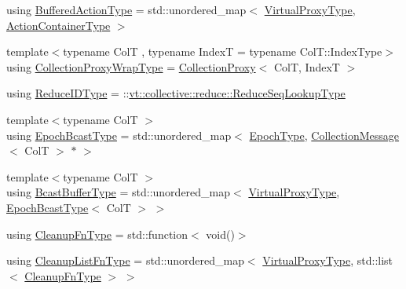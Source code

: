 \begin{DoxyCompactItemize}
using \hyperlink{structvt_1_1vrt_1_1collection_1_1_collection_manager_a7b32db0e6ccafa771ddd72f534a1cf8c}{Buffered\+Action\+Type} = std\+::unordered\+\_\+map$<$ \hyperlink{namespacevt_a1b417dd5d684f045bb58a0ede70045ac}{Virtual\+Proxy\+Type}, \hyperlink{structvt_1_1vrt_1_1collection_1_1_collection_manager_a536805fb5c58b557b66e7d7febe87567}{Action\+Container\+Type} $>$
\item 
{\footnotesize template$<$typename ColT , typename IndexT  = typename Col\+T\+::\+Index\+Type$>$ }\\using \hyperlink{structvt_1_1vrt_1_1collection_1_1_collection_manager_a56458ed7f9bb22b631b9b3a745f42f94}{Collection\+Proxy\+Wrap\+Type} = \hyperlink{structvt_1_1vrt_1_1collection_1_1_collection_proxy}{Collection\+Proxy}$<$ ColT, IndexT $>$
\item 
using \hyperlink{structvt_1_1vrt_1_1collection_1_1_collection_manager_aee9026deff88fc91bf48c0a05f5bd86b}{Reduce\+I\+D\+Type} = \+::\hyperlink{namespacevt_1_1collective_1_1reduce_a3e69dddbbc89a0c9e9b986c5642efeba}{vt\+::collective\+::reduce\+::\+Reduce\+Seq\+Lookup\+Type}
\item 
{\footnotesize template$<$typename ColT $>$ }\\using \hyperlink{structvt_1_1vrt_1_1collection_1_1_collection_manager_ade4647c26f1f20016fa0520bea640f59}{Epoch\+Bcast\+Type} = std\+::unordered\+\_\+map$<$ \hyperlink{namespacevt_a985a5adf291c34a3ca263b3378388236}{Epoch\+Type}, \hyperlink{structvt_1_1vrt_1_1collection_1_1_collection_message}{Collection\+Message}$<$ ColT $>$ $\ast$ $>$
\item 
{\footnotesize template$<$typename ColT $>$ }\\using \hyperlink{structvt_1_1vrt_1_1collection_1_1_collection_manager_af3a8c8a3c37301a98aa62f265858a3c0}{Bcast\+Buffer\+Type} = std\+::unordered\+\_\+map$<$ \hyperlink{namespacevt_a1b417dd5d684f045bb58a0ede70045ac}{Virtual\+Proxy\+Type}, \hyperlink{structvt_1_1vrt_1_1collection_1_1_collection_manager_ade4647c26f1f20016fa0520bea640f59}{Epoch\+Bcast\+Type}$<$ ColT $>$ $>$
\item 
using \hyperlink{structvt_1_1vrt_1_1collection_1_1_collection_manager_a95c122e5b83bc51c306c9367b8e62c07}{Cleanup\+Fn\+Type} = std\+::function$<$ void()$>$
\item 
using \hyperlink{structvt_1_1vrt_1_1collection_1_1_collection_manager_a735e54bc5a8646536d07750e2549a156}{Cleanup\+List\+Fn\+Type} = std\+::unordered\+\_\+map$<$ \hyperlink{namespacevt_a1b417dd5d684f045bb58a0ede70045ac}{Virtual\+Proxy\+Type}, std\+::list$<$ \hyperlink{structvt_1_1vrt_1_1collection_1_1_collection_manager_a95c122e5b83bc51c306c9367b8e62c07}{Cleanup\+Fn\+Type} $>$ $>$

\end{DoxyCompactItemize}
